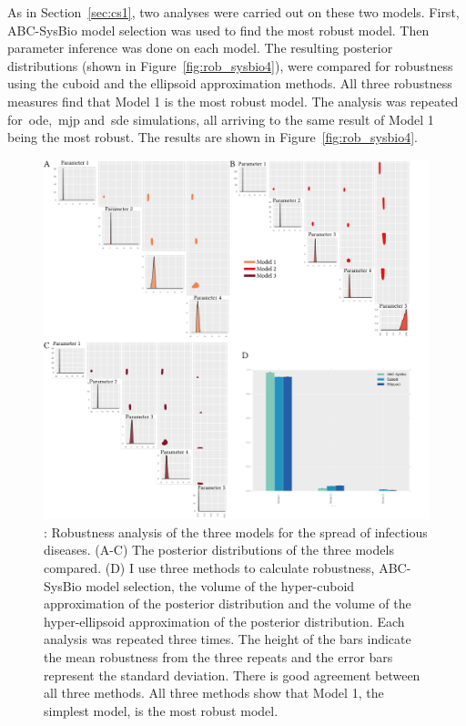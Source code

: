 
As in Section~\ref{sec:cs1}, two analyses were carried out on these two models. First, ABC-SysBio model selection was used to find the most robust model. Then parameter inference was done on each model. The resulting posterior distributions (shown in Figure~\ref{fig:rob_sysbio4}), were compared for robustness using the cuboid and the ellipsoid approximation methods. All three robustness measures find that Model 1 is the most robust model. The analysis was repeated for~\acrshort{ode},~\acrshort{mjp} and~\acrshort{sde} simulations, all arriving to the same result of Model 1 being the most robust. The results are shown in Figure~\ref{fig:rob_sysbio4}.


\begin{figure}[p]
\begin{center}
\includegraphics[width=\textwidth]{../../chapters/chapterStabilityFinder/images/ex1_sum.png}
\caption[Robustness analysis of case study 1]{\label{fig:rob_sysbio1}: Robustness analysis of the three models for the spread of infectious diseases. (A-C) The posterior distributions of the three models compared. (D) I use three methods to calculate robustness, ABC-SysBio model selection, the volume of the hyper-cuboid approximation of the posterior distribution and the volume of the hyper-ellipsoid approximation of the posterior distribution. Each analysis was repeated three times. The height of the bars indicate the mean robustness from the three repeats and the error bars represent the standard deviation. There is good agreement between all three methods. All three methods show that Model 1, the simplest model, is the most robust model. }

\end{center}
\end{figure}

